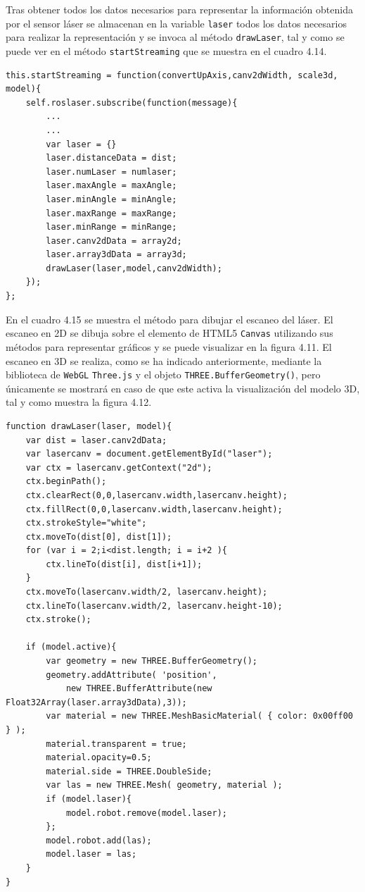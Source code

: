 Tras obtener todos los datos necesarios para representar la información obtenida por el sensor láser se almacenan en la variable \texttt{laser} todos los datos necesarios para realizar la representación y se invoca al método \texttt{drawLaser}, tal y como se puede ver en el método \texttt{startStreaming} que se muestra en el cuadro 4.14.

\begin{lstlisting}[caption= Subscripción y tratamiento del mensaje para su visualización 3D label=cod.subslaser3D]
this.startStreaming = function(convertUpAxis,canv2dWidth, scale3d, model){
	self.roslaser.subscribe(function(message){
		...
		...
		var laser = {}
		laser.distanceData = dist;
		laser.numLaser = numlaser;
		laser.maxAngle = maxAngle;
		laser.minAngle = minAngle;
		laser.maxRange = maxRange;
		laser.minRange = minRange;
		laser.canv2dData = array2d;
		laser.array3dData = array3d;
		drawLaser(laser,model,canv2dWidth);
	});
};
\end{lstlisting}

En el cuadro 4.15 se muestra el método para dibujar el escaneo del láser. El escaneo en 2D se dibuja sobre el elemento de HTML5 \texttt{Canvas} utilizando sus métodos para representar gráficos y se puede visualizar en la figura 4.11. El escaneo en 3D se realiza, como se ha indicado anteriormente, mediante la biblioteca de \texttt{WebGL} \texttt{Three.js} y el objeto \texttt{THREE.BufferGeometry()}, pero únicamente se mostrará en caso de que este activa la visualización del modelo 3D, tal y como muestra la figura 4.12.

\begin{lstlisting}[caption= Método para dibujar el escaneo del sensor láser, label=cod.dibujarlaser]
function drawLaser(laser, model){
	var dist = laser.canv2dData;
	var lasercanv = document.getElementById("laser");
	var ctx = lasercanv.getContext("2d");
	ctx.beginPath();
	ctx.clearRect(0,0,lasercanv.width,lasercanv.height);
	ctx.fillRect(0,0,lasercanv.width,lasercanv.height);
	ctx.strokeStyle="white";
	ctx.moveTo(dist[0], dist[1]);
	for (var i = 2;i<dist.length; i = i+2 ){
		ctx.lineTo(dist[i], dist[i+1]);
	}
	ctx.moveTo(lasercanv.width/2, lasercanv.height);
	ctx.lineTo(lasercanv.width/2, lasercanv.height-10);
	ctx.stroke();
	
	if (model.active){
		var geometry = new THREE.BufferGeometry();
		geometry.addAttribute( 'position', 
			new THREE.BufferAttribute(new Float32Array(laser.array3dData),3));
		var material = new THREE.MeshBasicMaterial( { color: 0x00ff00 } );
		material.transparent = true;
		material.opacity=0.5;
		material.side = THREE.DoubleSide;
		var las = new THREE.Mesh( geometry, material );
		if (model.laser){
			model.robot.remove(model.laser);
		};
		model.robot.add(las);
		model.laser = las;
	}
}
\end{lstlisting}


